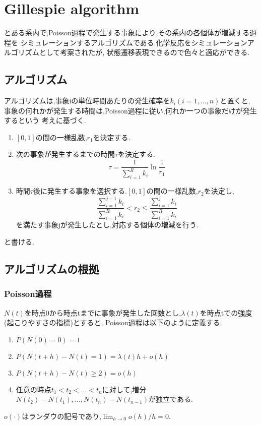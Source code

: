 \documentclass[12pt]{jsreport}
\begin{document}
\chapter{Gillespie algorithm}

とある系内で,Poisson過程で発生する事象により,その系内の各個体が増減する過程を
シミュレーションするアルゴリズムである.化学反応をシミュレーションアルゴリズムとして考案されたが,
状態遷移表現できるので色々と適応ができる.

\section{アルゴリズム}
アルゴリズムは,事象iの単位時間あたりの発生確率を$k_i(i=1,...,n)$と置くと,
事象の何れかが発生する時間は,Poisson過程に従い,何れか一つの事象だけが発生するという
考えに基づく.
\begin{enumerate}
\item $[0,1]$の間の一様乱数,$r_1$を決定する.
\item 次の事象が発生するまでの時間$\tau$を決定する.
\begin{equation}
 \tau = \frac{1}{\sum^{R}_{i=1} k_i}\ln\frac{1}{r_1}
\end{equation}
\item 時間$\tau$後に発生する事象を選択する.$[0,1]$の間の一様乱数,$r_2$を決定し,
\begin{equation}
 \frac{\sum^{j-1}_{i=1} k_i}{\sum^{R}_{i=1} k_i} < r_2 \leq \frac{\sum^{j}_{i=1} k_i}{\sum^{R}_{i=1} k_i}
\end{equation}
を満たす事象jが発生したとし,対応する個体の増減を行う.
\end{enumerate}

と書ける.

\section{アルゴリズムの根拠}
\subsection{Poisson過程}
$N(t)$を時点0から時点tまでに事象が発生した回数とし,$\lambda(t)$を時点tでの強度(起こりやすさの指標)とすると,
Poisson過程は以下のように定義する.
\begin{enumerate}
 \item $ P(N(0)=0) = 1$
 \item $ P(N(t+h)-N(t) = 1) = \lambda(t)h+o(h)$
 \item $ P(N(t+h)-N(t) \geq 2) = o(h)$
 \item 任意の時点$t_1 < t_2 < ... < t_n$に対して,増分$N(t_2)-N(t_1),...,N(t_n)-N(t_{n-1})$が独立である.
\end{enumerate}
$o(\cdot)$はランダウの記号であり,$\lim_{h \to 0} o(h)/h = 0$.
\end{document}

